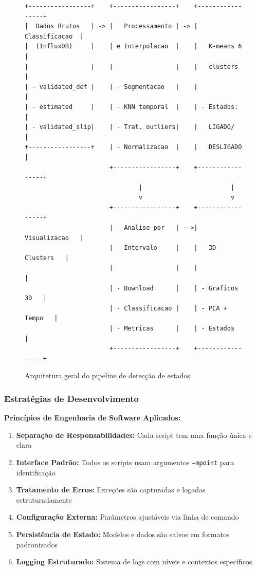 \begin{figure}[H]
    \centering
    \begin{minipage}{0.9\textwidth}
    \footnotesize
    \begin{verbatim}
+-----------------+    +-----------------+    +-----------------+
|  Dados Brutos   | -> |   Processamento | -> |  Classificacao  |
|  (InfluxDB)     |    | e Interpolacao  |    |   K-means 6     |
|                 |    |                 |    |   clusters      |
| - validated_def |    | - Segmentacao   |    |                 |
| - estimated     |    | - KNN temporal  |    | - Estados:      |
| - validated_slip|    | - Trat. outliers|    |   LIGADO/       |
+-----------------+    | - Normalizacao  |    |   DESLIGADO     |
                       +-----------------+    +-----------------+
                               |                        |
                               v                        v
                       +-----------------+    +-----------------+
                       |   Analise por   | -->|  Visualizacao   |
                       |   Intervalo     |    |   3D Clusters   |
                       |                 |    |                 |
                       | - Download      |    | - Graficos 3D   |
                       | - Classificacao |    | - PCA + Tempo   |
                       | - Metricas      |    | - Estados       |
                       +-----------------+    +-----------------+
\end{verbatim}
    \end{minipage}
    \caption{Arquitetura geral do pipeline de detecção de estados}
    \label{fig:arquitetura_pipeline}
\end{figure}


\subsubsection{Estratégias de Desenvolvimento}

\textbf{Princípios de Engenharia de Software Aplicados:}

\begin{enumerate}
    \item \textbf{Separação de Responsabilidades:} Cada script tem uma função única e clara
    \item \textbf{Interface Padrão:} Todos os scripts usam argumentos \texttt{--mpoint} para identificação
    \item \textbf{Tratamento de Erros:} Exceções são capturadas e logadas estruturadamente
    \item \textbf{Configuração Externa:} Parâmetros ajustáveis via linha de comando
    \item \textbf{Persistência de Estado:} Modelos e dados são salvos em formatos padronizados
    \item \textbf{Logging Estruturado:} Sistema de logs com níveis e contextos específicos
\end{enumerate}

